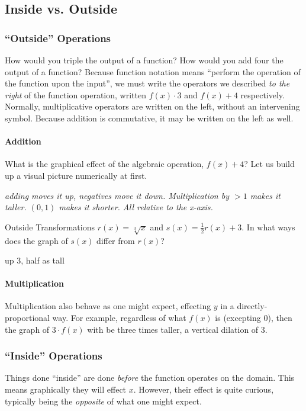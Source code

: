 \subsection{Inside vs. Outside}




\subsubsection{``Outside'' Operations}
How would you triple the output of a function?  How would you add four the output of a function?
Because function notation means ``perform the operation of the function upon the input'', we must
write the operators we described \emph{to the right} of the function operation, written $f(x) \cdot 3$
and $f(x) + 4$ respectively.  Normally, multiplicative operators are written on the left, without
an intervening symbol.  Because addition is commutative, it may be written on the left as well.

\paragraph{Addition}
What is the graphical effect of the algebraic operation, $f(x) + 4$?  Let us build up a visual picture
numerically at first.

\emph{adding moves it up, negatives move it down.  Multiplication by $>1$ makes it taller.
$(0,1)$ makes it shorter.  All relative to the x-axis.}

\begin{example}{Outside Transformations}
	\exProblem
$r(x)=\sqrt[3]{x}$ and $s(x)=\frac{1}{2}r(x)+3$.  In what ways does the graph of
$s(x)$ differ from $r(x)$?

	\exSolution
up 3, half as tall
\end{example}

\paragraph{Multiplication}
Multiplication also behave as one might expect, effecting $y$ in a directly-proportional way.
For example, regardless of what $f(x)$ is (excepting 0), then the graph of $3\cdot{}f(x)$
with be three times taller, a vertical dilation of 3.

\subsubsection{``Inside'' Operations}
Things done ``inside'' are done \emph{before} the function operates on the domain.  This means
graphically they will effect $x$.  However, their effect is quite curious, typically being the 
\emph{opposite} of what one might expect.

